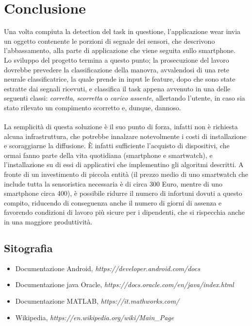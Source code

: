 \documentclass[a4paper, oneside]{book}
\begin{document}
	\chapter{Conclusione}
Una volta compiuta la detection del task in questione, l'applicazione wear invia un oggetto contenente le porzioni di segnale dei sensori, che descrivono l'abbassamento, alla parte di applicazione che viene seguita sullo smartphone. \\
Lo sviluppo del progetto termina a questo punto; la prosecuzione del lavoro dovrebbe prevedere la classificazione della manovra, avvalendosi di una rete neurale classificatrice, la quale prende in input le feature, dopo che sono state estratte dai segnali ricevuti, e classifica il task appena avvenuto in una delle seguenti classi: \textit{corretta}, \textit{scorretta} o \textit{carico assente}, allertando l'utente, in caso sia stato rilevato un compimento scorretto e, dunque, dannoso. \\ \\
La semplicità di questa soluzione è il suo punto di forza, infatti non è richiesta alcuna infrastruttura, che potrebbe innalzare notevolmente i costi di installazione e scoraggiarne la diffusione. È infatti sufficiente l’acquisto di dispositivi, che ormai fanno parte della vita quotidiana (smartphone e smartwatch), e l’installazione su di essi di applicativi che implementino gli algoritmi descritti.
A fronte di un investimento di piccola entità (il prezzo medio di uno smartwatch che include tutta la sensoristica necessaria è di circa 300 Euro, mentre di uno smartphone circa 400), è possibile ridurre il numero di infortuni dovuti a questo compito, riducendo di conseguenza anche il numero di giorni di assenza e favorendo condizioni di lavoro più sicure per i dipendenti, che si rispecchia anche in una maggiore produttività.


\clearpage
	\section{Sitografia}

\begin{itemize}
\item Documentazione Android, \textit{https://developer.android.com/docs}
\item Documentazione java Oracle, \textit{https://docs.oracle.com/en/java/index.html}
\item Documentazione MATLAB, \textit{https://it.mathworks.com/}
\item Wikipedia, \textit{https://en.wikipedia.org/wiki/Main\_Page}
\end{itemize}
\end{document}

